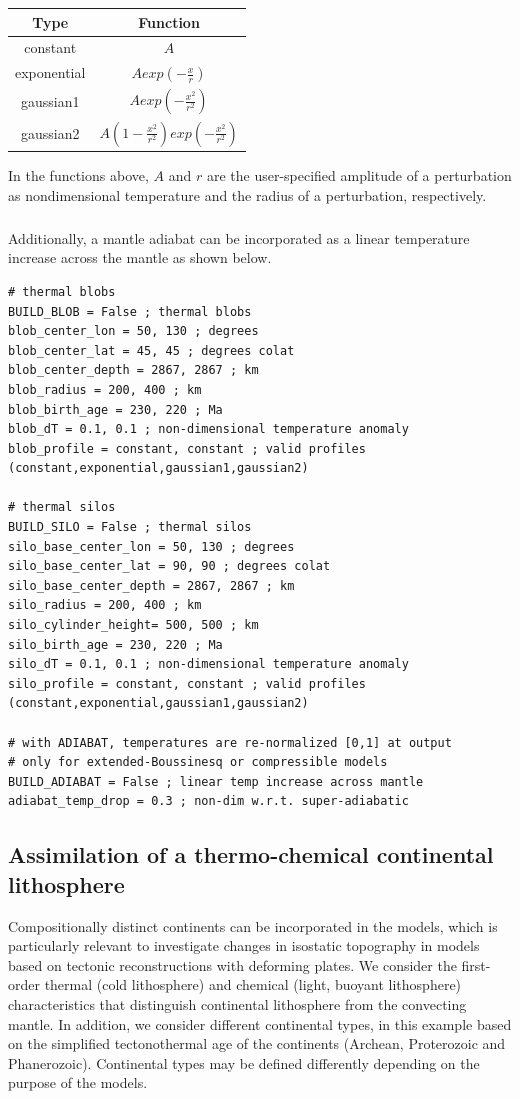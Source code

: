 \documentclass[letterpaper,12pt]{article}
\begin{document}
\begin{tabular}{cc}
Type & Function \\
\hline
constant            & $A$ \\
exponential         & $A exp(-\frac{x}{r})$ \\
gaussian1           & $A exp(-\frac{x^2}{r^2})$ \\
gaussian2           & $A (1 - \frac{x^2}{r^2}) exp(-\frac{x^2}{r^2})$ \\
\end{tabular}

In the functions above, $A$ and $r$ are the user-specified amplitude of a perturbation as nondimensional temperature and the radius of a perturbation, respectively.
\subparagraph{}
Additionally, a mantle adiabat can be incorporated as a linear temperature increase across the mantle as shown below.

\begin{verbatim}
# thermal blobs
BUILD_BLOB = False ; thermal blobs
blob_center_lon = 50, 130 ; degrees
blob_center_lat = 45, 45 ; degrees colat
blob_center_depth = 2867, 2867 ; km
blob_radius = 200, 400 ; km
blob_birth_age = 230, 220 ; Ma
blob_dT = 0.1, 0.1 ; non-dimensional temperature anomaly
blob_profile = constant, constant ; valid profiles (constant,exponential,gaussian1,gaussian2)

# thermal silos
BUILD_SILO = False ; thermal silos
silo_base_center_lon = 50, 130 ; degrees
silo_base_center_lat = 90, 90 ; degrees colat
silo_base_center_depth = 2867, 2867 ; km
silo_radius = 200, 400 ; km
silo_cylinder_height= 500, 500 ; km
silo_birth_age = 230, 220 ; Ma
silo_dT = 0.1, 0.1 ; non-dimensional temperature anomaly
silo_profile = constant, constant ; valid profiles (constant,exponential,gaussian1,gaussian2)

# with ADIABAT, temperatures are re-normalized [0,1] at output
# only for extended-Boussinesq or compressible models
BUILD_ADIABAT = False ; linear temp increase across mantle
adiabat_temp_drop = 0.3 ; non-dim w.r.t. super-adiabatic
\end{verbatim}

\subsection{Assimilation of a thermo-chemical continental lithosphere}

Compositionally distinct continents can be incorporated in the models, which is particularly relevant to investigate changes in isostatic topography in models based on tectonic reconstructions with deforming plates.  We consider the first-order thermal (cold lithosphere) and chemical (light, buoyant lithosphere) characteristics that distinguish continental lithosphere from the convecting mantle.  In addition, we consider different continental types, in this example based on the simplified tectonothermal age of the continents (Archean, Proterozoic and Phanerozoic).  Continental types may be defined differently depending on the purpose of the models.
\end{document}
